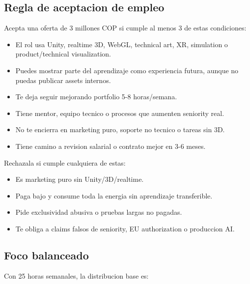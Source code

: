 \subsection{Regla de aceptacion de empleo}


Acepta una oferta de 3 millones COP si cumple al menos 3 de estas condiciones:


\begin{itemize}
\item El rol usa Unity, realtime 3D, WebGL, technical art, XR, simulation o product/technical visualization.
\item Puedes mostrar parte del aprendizaje como experiencia futura, aunque no puedas publicar assets internos.
\item Te deja seguir mejorando portfolio 5-8 horas/semana.
\item Tiene mentor, equipo tecnico o procesos que aumenten seniority real.
\item No te encierra en marketing puro, soporte no tecnico o tareas sin 3D.
\item Tiene camino a revision salarial o contrato mejor en 3-6 meses.
\end{itemize}


Rechazala si cumple cualquiera de estas:


\begin{itemize}
\item Es marketing puro sin Unity/3D/realtime.
\item Paga bajo y consume toda la energia sin aprendizaje transferible.
\item Pide exclusividad abusiva o pruebas largas no pagadas.
\item Te obliga a claims falsos de seniority, EU authorization o produccion AI.
\end{itemize}


\subsection{Foco balanceado}


Con 25 horas semanales, la distribucion base es:


